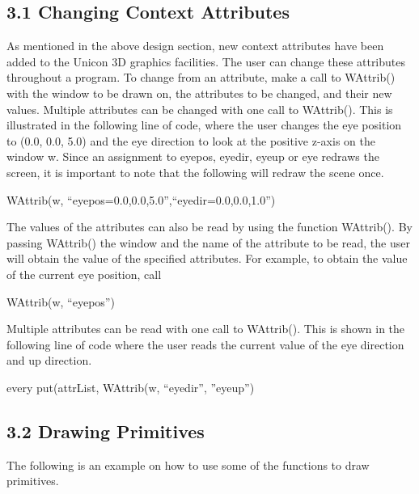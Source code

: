 \documentclass[letterpaper]{article}
\begin{document}
\subsection[3.1 Changing Context Attributes]{3.1 Changing Context Attributes}

As mentioned in the above design section, new context attributes have
been added to the Unicon 3D graphics facilities.  The user can change
these attributes throughout a program. To change from an attribute,
make a call to \textsf{WAttrib()} with the window to be drawn on, the
attributes to be changed, and their new values. Multiple attributes
can be changed with one call to \textsf{WAttrib()}. This is
illustrated in the following line of code, where the user changes the
eye position to \textsf{(0.0, 0.0, 5.0)} and the eye direction to look
at the positive z-axis on the window w. Since an assignment to
\textsf{eyepos}, \textsf{eyedir}, \textsf{eyeup} or \textsf{eye}
redraws the screen, it is important to note that the following will
redraw the scene once.


\bigskip

{\sffamily
WAttrib(w, ``eyepos=0.0,0.0,5.0'',``eyedir=0.0,0.0,1.0'')}


\bigskip

The values of the attributes can also be read by using the function
\textsf{WAttrib()}. By passing \textsf{WAttrib()} the window
and the name of the attribute to be read, the user will obtain the
value of the specified attributes. For example, to obtain the value of
the current eye position, call


\bigskip

{\sffamily
WAttrib(w, ``eyepos'')}


\bigskip

Multiple attributes can be read with one call to
\textsf{WAttrib()}. This is shown in the following line of code where
the user reads the current value of the eye direction and up direction.

\bigskip

{\sffamily
every put(attrList, WAttrib(w, ``eyedir'', ''eyeup'')}


\subsection[3.2 Drawing Primitives]{3.2 Drawing Primitives}

The following is an example on how to use some of the functions to
draw primitives.
\end{document}
